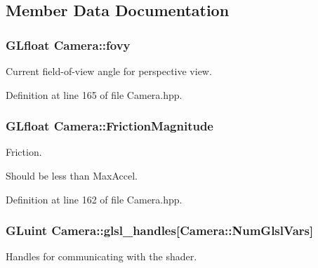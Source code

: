 \subsection{Member Data Documentation}
\hypertarget{class_camera_acc8b97facc57059530efad534c2f8314}{
\subsubsection[{fovy}]{\setlength{\rightskip}{0pt plus 5cm}G\-Lfloat Camera\-::fovy\hspace{0.3cm}{\ttfamily [private]}}}\label{class_camera_acc8b97facc57059530efad534c2f8314}


Current field-\/of-\/view angle for perspective view. 



Definition at line 165 of file Camera.\-hpp.

\hypertarget{class_camera_a4260507a4e59b2b079a0e1c6a5b64d5c}{
\subsubsection[{Friction\-Magnitude}]{\setlength{\rightskip}{0pt plus 5cm}G\-Lfloat Camera\-::\-Friction\-Magnitude\hspace{0.3cm}{\ttfamily [private]}}}\label{class_camera_a4260507a4e59b2b079a0e1c6a5b64d5c}


Friction. 

Should be less than Max\-Accel. 

Definition at line 162 of file Camera.\-hpp.

\hypertarget{class_camera_a1635486d7f9e0d52b241899a270ee335}{
\subsubsection[{glsl\-\_\-handles}]{\setlength{\rightskip}{0pt plus 5cm}G\-Luint Camera\-::glsl\-\_\-handles\mbox{[}Camera\-::\-Num\-Glsl\-Vars\mbox{]}\hspace{0.3cm}{\ttfamily [private]}}}\label{class_camera_a1635486d7f9e0d52b241899a270ee335}


Handles for communicating with the shader. 



